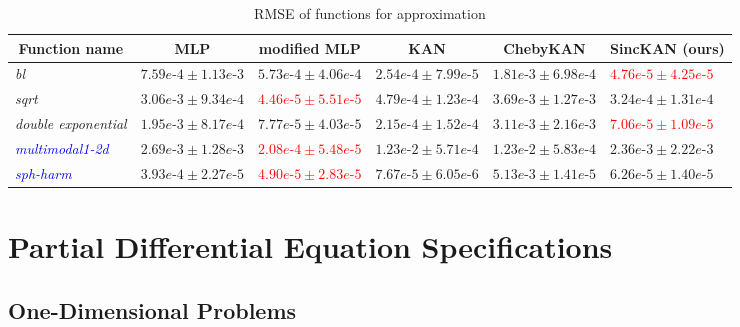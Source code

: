 \begin{table}[ht]
\caption{RMSE of functions for approximation}
\label{table: function approxmation rest}
\begin{center}
\begin{adjustbox}{width=\columnwidth, center}
\begin{tabular}{llllll}
\multicolumn{1}{c}{\bf Function name}  & \multicolumn{1}{c}{\bf MLP} & \multicolumn{1}{c}{\bf modified MLP} &\multicolumn{1}{c}{\bf KAN} & \multicolumn{1}{c}{\bf ChebyKAN} & \multicolumn{1}{c}{\bf SincKAN (ours)} 
\\ \hline
\textit{bl} & $7.59e\mbox{-}4 \pm 1.13e\mbox{-}3$ & $5.73e\mbox{-}4 \pm 4.06e\mbox{-}4$ & $2.54e\mbox{-}4 \pm 7.99e\mbox{-}5$ &
$1.81e\mbox{-}3 \pm 6.98e\mbox{-}4$ &
\textcolor{red}{$4.76e\mbox{-}5 \pm 4.25e\mbox{-}5$} \\ 
\textit{sqrt} & $3.06e\mbox{-}3 \pm 9.34 e\mbox{-}4$ & \textcolor{red}{$4.46 e\mbox{-}5 \pm 5.51e\mbox{-}5$} & $4.79e\mbox{-}4 \pm 1.23e\mbox{-}4$ &
$3.69e\mbox{-}3 \pm 1.27 e\mbox{-}3$ &
$3.24e\mbox{-}4 \pm 1.31e\mbox{-}4$\\ 
\textit{double exponential} & $1.95e\mbox{-}3 \pm 8.17e\mbox{-}4$ & $7.77e\mbox{-}5 \pm 4.03e\mbox{-}5$ & $2.15e\mbox{-}4 \pm 1.52e\mbox{-}4$ &
$3.11e\mbox{-}3 \pm 2.16 e\mbox{-}3$ &
\textcolor{red}{$7.06e\mbox{-}5 \pm 1.09e\mbox{-}5$} \\ 
\textcolor{blue}{\textit{multimodal1-2d}} & $2.69e\mbox{-}3 \pm 1.28 e\mbox{-}3$ & \textcolor{red}{$2.08e\mbox{-}4 \pm 5.48e\mbox{-}5$} & $1.23e\mbox{-}2 \pm 5.71 e\mbox{-}4$ &
$1.23e\mbox{-}2 \pm 5.83e\mbox{-}4$ &
$2.36e\mbox{-}3 \pm 2.22e\mbox{-}3$ \\
\textcolor{blue}{\textit{sph-harm}} & 
$3.93e\mbox{-}4 \pm 2.27 e\mbox{-}5$ & 
\textcolor{red}{$4.90e\mbox{-}5 \pm 2.83e\mbox{-}5$} &
$7.67e\mbox{-}5 \pm 6.05 e\mbox{-}6$ &
$5.13e\mbox{-}3 \pm 1.41 e\mbox{-}5$ &
$6.26e\mbox{-}5 \pm 1.40 e\mbox{-}5$ \\

\end{tabular}
\end{adjustbox}
\end{center}
\end{table}

\section{Partial Differential Equation Specifications}\label{Appendix: details of pde}
\subsection{One-Dimensional Problems}
